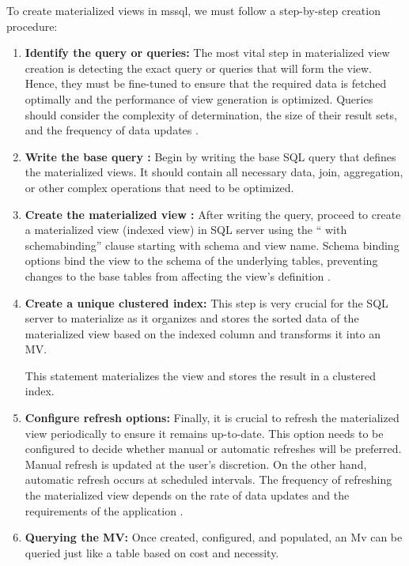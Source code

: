  To create materialized views in mssql, we must follow a step-by-step creation procedure:
 \begin{enumerate}
     

     \item\textbf{Identify the query or queries:} The most vital step in materialized view creation is detecting the exact query or queries that will form the view. Hence, they must be fine-tuned to ensure that the required data is fetched optimally and the performance of view generation is optimized. Queries should consider the complexity of determination, the size of their result sets, and the frequency of data updates \cite{castordoc2023}.
     
      \item\textbf{ Write the base query :} Begin by writing the base  SQL query that defines the materialized views. It should contain all necessary data, join, aggregation, or other complex operations that need to be optimized. \vspace{0.4cm}
      
      
      \item\textbf{ Create the materialized view :} After writing the query, proceed to create a materialized view (indexed view) in SQL server using the `` with schemabinding'' clause starting with schema and view name. Schema binding options bind the view to the schema of the underlying tables, preventing changes to the base tables from affecting the view's definition \cite{risingwave2024}.\vspace{0.4cm}

      

      \item\textbf{ Create a unique clustered index:} This step is very crucial for the SQL server to materialize as it organizes and stores the sorted data of the materialized view based on the indexed column and transforms it into an MV. \vspace{0.4cm}
      
       

This statement materializes the view and stores the result in a clustered index.
      
      \item\textbf{ Configure refresh options:} Finally, it is crucial to refresh the materialized view periodically to ensure it remains up-to-date. This option needs to be configured to decide whether manual or automatic refreshes will be preferred. Manual refresh is updated at the user's discretion. On the other hand, automatic refresh occurs at scheduled intervals. The frequency of refreshing the materialized view depends on the rate of data updates and the requirements of the application \cite{castordoc2023}.\vspace{0.4cm}
      
      \item\textbf{ Querying the MV:} Once created, configured, and populated, an Mv can be queried just like a table based on cost and necessity.  \vspace{0.4cm}
      

\end{enumerate}

